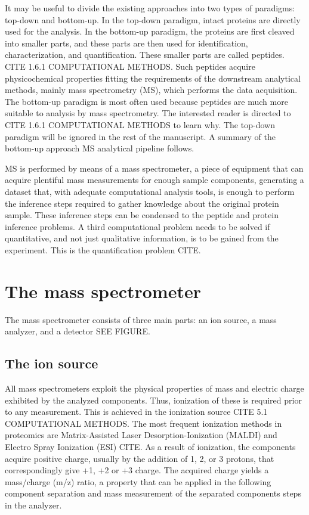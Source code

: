 \documentclass[11pt, a4paper]{report}
\begin{document}
It may be useful to divide the existing approaches into two types of paradigms: top-down and bottom-up. In the top-down paradigm, intact proteins are directly used for the analysis. In the bottom-up paradigm, the proteins are first cleaved into smaller parts, and these parts are then used for identification, characterization, and quantification. These smaller parts are called peptides. CITE 1.6.1 COMPUTATIONAL METHODS. Such peptides acquire physicochemical properties fitting the requirements of the downstream analytical methods, mainly mass spectrometry (MS), which performs the data acquisition. The bottom-up paradigm is most often used because peptides are much more suitable to analysis by mass spectrometry. The interested reader is directed to CITE 1.6.1 COMPUTATIONAL METHODS to learn why. The top-down paradigm will be ignored in the rest of the manuscript. A summary of the bottom-up approach MS analytical pipeline follows.


MS is performed by means of a mass spectrometer, a piece of equipment that can acquire plentiful mass measurements for enough sample components, generating a dataset that, with adequate computational analysis tools, is enough to perform the inference steps required to gather knowledge about the original protein sample. These inference steps can be condensed to the peptide and protein inference problems. A third computational problem needs to be solved if quantitative, and not just qualitative information, is to be gained from the experiment. This is the quantification problem CITE.


\section{The mass spectrometer}

The mass spectrometer consists of three main parts: an ion source, a mass analyzer, and a detector SEE FIGURE.

\subsection{The ion source}

All mass spectrometers exploit the physical properties of mass and electric charge exhibited by the analyzed components. Thus, ionization of these is required prior to any measurement. This is achieved in the ionization source CITE 5.1 COMPUTATIONAL METHODS. The most frequent ionization methods in proteomics are Matrix-Assisted Laser Desorption-Ionization (MALDI) and Electro Spray Ionization (ESI) CITE. As a result of ionization, the components acquire positive charge, usually by the addition of 1, 2, or 3 protons, that correspondingly give +1, +2 or +3 charge. The acquired charge yields a mass/charge (m/z) ratio, a property that can be applied in the following component separation and mass measurement of the separated components steps in the analyzer.
\end{document}
